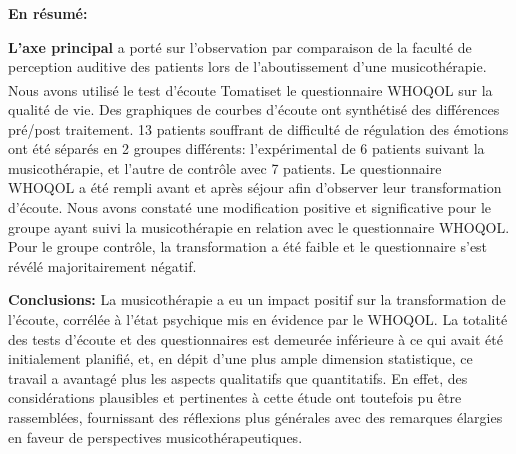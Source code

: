  
 
  





  
  \textbf{En résumé:} 
  
  \textbf{ L'axe principal}  a porté sur l'observation par comparaison de la faculté de 
  perception auditive 
  des patients lors de l'aboutissement d'une musicothérapie. Nous avons utilisé 
   le test d'écoute Tomatis\textsuperscript \textregistered   et le questionnaire WHOQOL sur la qualité de 
   vie.
  Des graphiques de courbes d'écoute ont synthétisé des différences pré/post traitement.
  13 patients souffrant de difficulté de régulation des émotions ont été séparés en 2 
  groupes différents: l'expérimental de 6 patients suivant la musicothérapie, et l'autre de
  contrôle avec 7 patients. Le questionnaire WHOQOL a été  rempli avant et 
  après séjour afin d'observer leur transformation d'écoute. %
  Nous avons constaté une modification positive et significative pour le groupe ayant 
  suivi la 
  musicothérapie en relation avec le questionnaire WHOQOL.
  Pour le groupe contrôle, la transformation a été faible et le questionnaire s'est révélé majoritairement 
  négatif.
  
  
   \textbf{Conclusions:} La musicothérapie a eu un impact positif sur la transformation de l'écoute, 
  corrélée 
  à l'état psychique mis en évidence par le WHOQOL.
 La totalité des tests d'écoute et des questionnaires est demeurée  
inférieure à ce qui avait été initialement planifié, et, en dépit d'une plus ample dimension statistique, ce 
travail a avantagé plus les aspects qualitatifs que quantitatifs. 
En effet, des considérations plausibles et pertinentes à cette étude ont toutefois pu être rassemblées, 
fournissant des réflexions plus générales avec des remarques élargies en faveur de perspectives 
musicothérapeutiques.%
%

